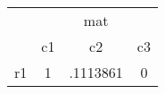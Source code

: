 \begin{table}[htbp]\centering
\caption{}
\begin{tabular}{l*{3}{c}}
\hline\hline
            &\multicolumn{3}{c}{mat}               \\
            &          c1&          c2&          c3\\
\hline
r1          &           1&    .1113861&           0\\
\hline\hline
\end{tabular}
\end{table}
